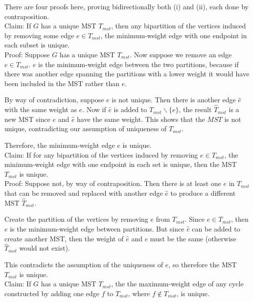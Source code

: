 \documentclass[12pt]{article}
\begin{document}
\begin{enumerate}
\begin{enumerate}
         There are four proofs here, proving bidirectionally both (i) and (ii), each done by contraposition.\\
         
         Claim: If $G$ has a unique MST $T_{mst}$, then any bipartition of the vertices induced by removing some edge $e \in T_{mst}$, the minimum-weight edge 
with one endpoint in each subset is unique.\\
         
         Proof: Suppose $G$ has a unique MST $T_{mst}$. Now suppose we remove an edge $e \in T_{mst}$. $e$ is the minimum-weight edge between the two 
partitions, because if there was another edge spanning the partitions with a lower weight it would have been included in the MST rather than $e$.
         
         By way of contradiction, suppose $e$ is not unique. Then there is another edge $\hat{e}$ with the same weight as $e$. Now if $\hat{e}$ is added to 
$T_{mst} \backslash \{e\}$, the result $\hat{T}_{mst}$ is a new MST since $e$ and $\hat{e}$ have the same weight. This shows that the $MST$ is not unique, 
contradicting our assumption of uniqueness of $T_{mst}$.
         
         Therefore, the minimum-weight edge $e$ is unique.\\
         
         Claim: If for any bipartition of the vertices induced by removing $e \in T_{mst}$, the minimum-weight edge with one endpoint in each set is unique, 
then the MST $T_{mst}$ is unique.\\
         
         Proof: Suppose not, by way of contraposition. Then there is at least one $e$ in $T_{mst}$ that can be removed and replaced with another edge 
$\hat{e}$ to produce a different MST $\hat{T}_{mst}$.
         
         Create the partition of the vertices by removing $e$ from $T_{mst}$. Since $e \in T_{mst}$, then $e$ is the minimum-weight edge between partitions. 
But since $\hat{e}$ can be added to create another MST, then the weight of $\hat{e}$ and $e$ must be the same (otherwise $\hat{T}_{mst}$ would not exist).
         
         This contradicts the assumption of the uniqueness of $e$, so therefore the MST $T_{mst}$ is unique.\\
         
         Claim: If $G$ has a unique MST $T_{mst}$, the the maximum-weight edge of any cycle constructed by adding one edge $f$ to $T_{mst}$, where $f \not \in 
T_{mst}$, is unique.\\
         

\end{enumerate}
\end{enumerate}
\end{document}
